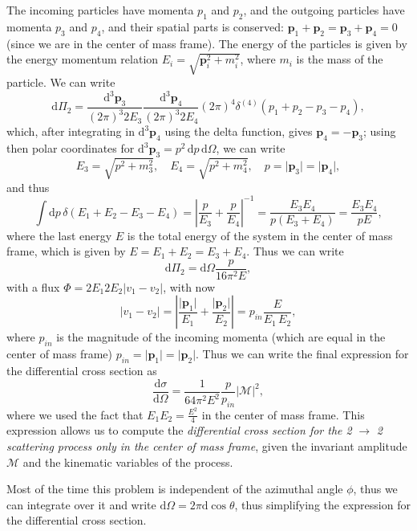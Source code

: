 \begin{example}
\begin{figure}[H]
\begin{tikzpicture}[scale=0.8, thick]
        \end{tikzpicture}
    \end{figure}
    The incoming particles have momenta \(p_1\) and \(p_2\), and the outgoing particles have momenta \(p_3\) and \(p_4\), and their spatial parts is conserved: \(\mathbf{p}_1 + \mathbf{p}_2 = \mathbf{p}_3 + \mathbf{p}_4 = 0\) (since we are in the center of mass frame). The energy of the particles is given by the energy momentum relation \(E_i = \sqrt{\mathbf{p}_i^2 + m_i^2}\), where \(m_i\) is the mass of the particle. We can write
    \[
        \mathrm{d} \Pi_2 = \frac{\mathrm{d}^3 \mathbf{p}_3}{(2\pi)^3 2 E_3} \frac{\mathrm{d}^3 \mathbf{p}_4}{(2\pi)^3 2 E_4} (2\pi)^4 \delta^{(4)}(p_1 + p_2 - p_3 - p_4),
    \]
    which, after integrating in \(\mathrm{d}^3 \mathbf{p}_4\) using the delta function, gives \(\mathbf{p}_4 = - \mathbf{p}_3\); using then polar coordinates for \(\mathrm{d}^3 \mathbf{p}_3 = p^2\, \mathrm{d} p\, \mathrm{d} \Omega\), we can write
    \[
        E_3 = \sqrt{p^2 + m_3^2}, \quad E_4 = \sqrt{p^2 + m_4^2}, \quad p = \vert \mathbf{p}_3 \vert = \vert \mathbf{p}_4 \vert,
    \]
    and thus
    \[
        \int \mathrm{d} p \, \delta(E_1 + E_2 - E_3 - E_4) = \left\vert \frac{p}{E_3} + \frac{p}{E_4} \right\vert^{-1} = \frac{E_3 E_4}{p (E_3 + E_4)} = \frac{E_3 E_4}{p E},
    \]
    where the last energy \(E\) is the total energy of the system in the center of mass frame, which is given by \(E = E_1 + E_2 = E_3 + E_4\). Thus we can write
    \[
        \mathrm{d} \Pi_2 = \mathrm{d} \Omega \frac{p}{16 \pi^2 E},
    \]
    with a flux \(\Phi = 2 E_1 2 E_2 \vert v_1 - v_2 \vert\), with now
    \[
        \vert v_1 - v_2 \vert = \left\vert \frac{\vert \mathbf{p}_1 \vert }{E_1} + \frac{\vert \mathbf{p}_2 \vert }{E_2} \right\vert = p_{in} \frac{E}{E_1 \, E_2},
    \]
    where \(p_{in}\) is the magnitude of the incoming momenta (which are equal in the center of mass frame) \(p_{in} = \vert \mathbf{p}_1 \vert = \vert \mathbf{p}_2 \vert \). Thus we can write the final expression for the differential cross section as
    \[
        \frac{\mathrm{d} \sigma}{\mathrm{d} \Omega} = \frac{1}{64 \pi^2 E^2} \frac{p}{p_{in}} |\mathcal{M}|^2,
    \]
    where we used the fact that \(E_1 E_2 = \frac{E^2}{4}\) in the center of mass frame. This expression allows us to compute the \textit{differential cross section for the 2} \(\to\) \textit{2 scattering process only in the center of mass frame}, given the invariant amplitude \(\mathcal{M}\) and the kinematic variables of the process.
    \begin{remark}
        Most of the time this problem is independent of the azimuthal angle \(\phi\), thus we can integrate over it and write \(\mathrm{d}\Omega = 2\pi \mathrm{d} \cos \theta\), thus simplifying the expression for the differential cross section.


\end{remark}
\end{example}
